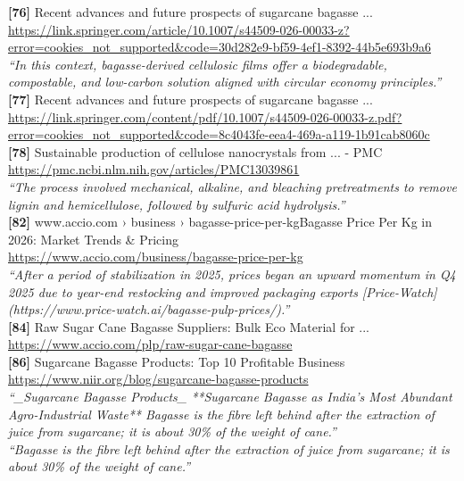 \textbf{[76]} Recent advances and future prospects of sugarcane bagasse ...\\[0.15em]
\url{https://link.springer.com/article/10.1007/s44509-026-00033-z?error=cookies_not_supported&code=30d282e9-bf59-4ef1-8392-44b5e693b9a6}\\[0.2em]
\emph{``In this context, bagasse-derived cellulosic films offer a biodegradable, compostable, and low-carbon solution aligned with circular economy principles.''}\\[0.45em]

\textbf{[77]} Recent advances and future prospects of sugarcane bagasse ...\\[0.15em]
\url{https://link.springer.com/content/pdf/10.1007/s44509-026-00033-z.pdf?error=cookies_not_supported&code=8c4043fe-eea4-469a-a119-1b91cab8060c}\\[0.2em]

\textbf{[78]} Sustainable production of cellulose nanocrystals from ... - PMC\\[0.15em]
\url{https://pmc.ncbi.nlm.nih.gov/articles/PMC13039861}\\[0.2em]
\emph{``The process involved mechanical, alkaline, and bleaching pretreatments to remove lignin and hemicellulose, followed by sulfuric acid hydrolysis.''}\\[0.45em]

\textbf{[82]} www.accio.com › business › bagasse-price-per-kgBagasse Price Per Kg in 2026: Market Trends \& Pricing\\[0.15em]
\url{https://www.accio.com/business/bagasse-price-per-kg}\\[0.2em]
\emph{``After a period of stabilization in 2025, prices began an upward momentum in Q4 2025 due to year-end restocking and improved packaging exports [Price-Watch](https://www.price-watch.ai/bagasse-pulp-prices/).''}\\[0.45em]

\textbf{[84]} Raw Sugar Cane Bagasse Suppliers: Bulk Eco Material for ...\\[0.15em]
\url{https://www.accio.com/plp/raw-sugar-cane-bagasse}\\[0.2em]

\textbf{[86]} Sugarcane Bagasse Products: Top 10 Profitable Business\\[0.15em]
\url{https://www.niir.org/blog/sugarcane-bagasse-products}\\[0.2em]
\emph{``\_Sugarcane Bagasse Products\_ **Sugarcane Bagasse as India’s Most Abundant Agro-Industrial Waste** Bagasse is the fibre left behind after the extraction of juice from sugarcane; it is about 30\% of the weight of cane.''}\\[0.45em]
\emph{``Bagasse is the fibre left behind after the extraction of juice from sugarcane; it is about 30\% of the weight of cane.''}\\[0.45em]

